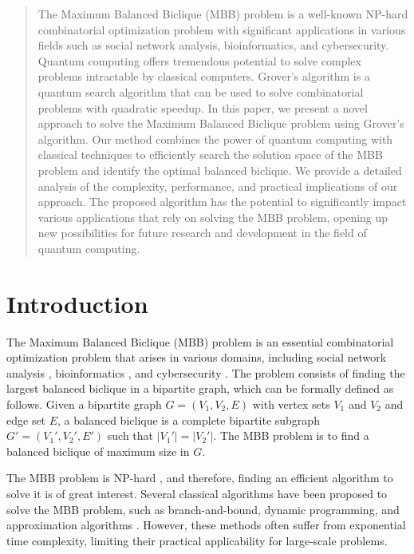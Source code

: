 \begin{abstract}
The Maximum Balanced Biclique (MBB) problem is a well-known NP-hard combinatorial optimization problem with significant applications in various fields such as social network analysis, bioinformatics, and cybersecurity. Quantum computing offers tremendous potential to solve complex problems intractable by classical computers. Grover's algorithm is a quantum search algorithm that can be used to solve combinatorial problems with quadratic speedup. In this paper, we present a novel approach to solve the Maximum Balanced Biclique problem using Grover's algorithm. Our method combines the power of quantum computing with classical techniques to efficiently search the solution space of the MBB problem and identify the optimal balanced biclique. We provide a detailed analysis of the complexity, performance, and practical implications of our approach. The proposed algorithm has the potential to significantly impact various applications that rely on solving the MBB problem, opening up new possibilities for future research and development in the field of quantum computing.

\end{abstract}

\section{Introduction}

The Maximum Balanced Biclique (MBB) problem is an essential combinatorial optimization problem that arises in various domains, including social network analysis \cite{peeters}, bioinformatics \cite{bioinformatics}, and cybersecurity \cite{cybersecurity}. The problem consists of finding the largest balanced biclique in a bipartite graph, which can be formally defined as follows. Given a bipartite graph $G = (V_1, V_2, E)$ with vertex sets $V_1$ and $V_2$ and edge set $E$, a balanced biclique is a complete bipartite subgraph $G' = (V_1', V_2', E')$ such that $|V_1'| = |V_2'|$. The MBB problem is to find a balanced biclique of maximum size in $G$.

The MBB problem is NP-hard \cite{nphard}, and therefore, finding an efficient algorithm to solve it is of great interest. Several classical algorithms have been proposed to solve the MBB problem, such as branch-and-bound, dynamic programming, and approximation algorithms \cite{classical}. However, these methods often suffer from exponential time complexity, limiting their practical applicability for large-scale problems.

